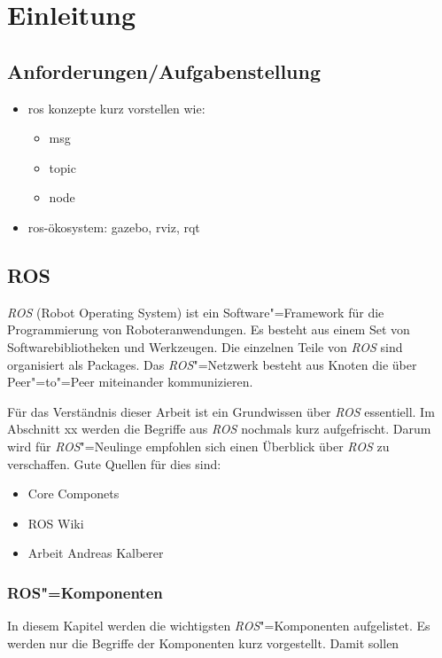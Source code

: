 \chapter{Einleitung}

\section{Anforderungen/Aufgabenstellung}

\begin{itemize}
\item ros konzepte kurz vorstellen wie:
	\begin{itemize}
	\item msg
	\item topic
	\item node
	\end{itemize}
\item ros-ökosystem: gazebo, rviz, rqt
\end{itemize}

\section{ROS}
\textit{ROS} (Robot Operating System) ist ein Software"=Framework für die Programmierung von Roboteranwendungen.
Es besteht aus einem Set von Softwarebibliotheken und Werkzeugen.
Die einzelnen Teile von \textit{ROS} sind organisiert als Packages.
Das \textit{ROS}"=Netzwerk besteht aus Knoten die über Peer"=to"=Peer miteinander kommunizieren.

Für das Verständnis dieser Arbeit ist ein Grundwissen über \textit{ROS} essentiell.
Im Abschnitt xx werden die Begriffe aus \textit{ROS} nochmals kurz aufgefrischt. %
Darum wird für \textit{ROS}"=Neulinge empfohlen sich einen Überblick über \textit{ROS} zu verschaffen.
Gute Quellen für dies sind:
\begin{itemize}
\item Core Componets %
\item ROS Wiki
\item Arbeit Andreas Kalberer
\end{itemize}


\subsection{ROS"=Komponenten}
In diesem Kapitel werden die wichtigsten \textit{ROS}"=Komponenten aufgelistet.
Es werden nur die Begriffe der Komponenten kurz vorgestellt.
Damit sollen 

